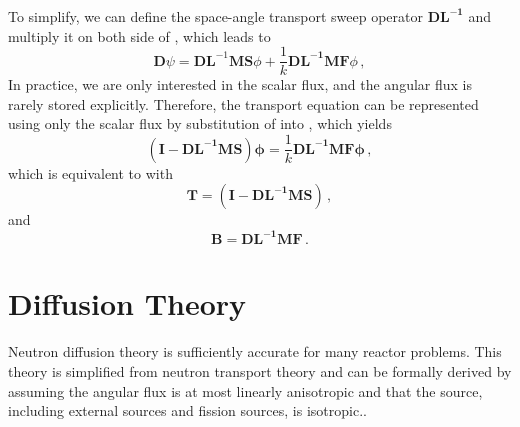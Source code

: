 To simplify, we can define the space-angle transport sweep operator $\mathbf{DL^{-1}}$ and multiply it on both side of , which leads to
\begin{equation}
  \mathbf{D} \psi =  \mathbf{DL}^{-1}\mathbf{MS}\phi + \frac{1}{k} \mathbf{DL^{-1}MF} \phi  \, ,
 \label{eq:operatortrans}
\end{equation}
In practice, we are only interested in the scalar flux, and the angular flux is rarely stored explicitly. Therefore, the transport equation can be represented using only the scalar flux by substitution of  into , which yields
\begin{equation}
  \mathbf{(I - DL^{-1}MS)} \mathbf{\phi} = \frac{1}{k} \mathbf{DL^{-1}MF} \mathbf{\phi}  \, ,
 \label{eq:keig}
\end{equation}
which is equivalent to  with
\begin{equation}
  \mathbf{T} = \mathbf{(I - DL^{-1}MS)}  \, ,
 \label{eq:AG}
\end{equation}
 and 
\begin{equation}
  \mathbf{B} = \mathbf{DL^{-1}MF}  \, .
 \label{eq:B}
\end{equation}

\section{Diffusion Theory}
Neutron diffusion theory is sufficiently accurate for many reactor problems.
This theory is simplified from neutron transport theory and can be formally derived by assuming the angular flux is at most linearly anisotropic and that the source, including external sources and fission sources, is isotropic.\cite{stacey2018nuclear}.

